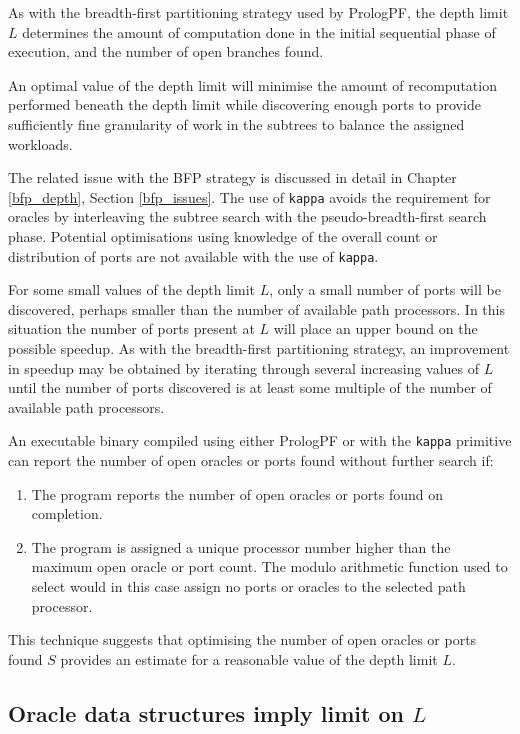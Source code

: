 As with the breadth-first partitioning strategy used by PrologPF, the depth
limit $L$ determines the amount of computation done in the initial sequential
phase of execution, and the number of open branches found.

An optimal value of the depth limit will minimise the amount of recomputation
performed beneath the depth limit while discovering enough ports to provide sufficiently
fine granularity of work in the subtrees to balance the assigned workloads.

The related issue with the BFP strategy is discussed in detail in Chapter \ref{bfp_depth},
Section \ref{bfp_issues}.  The use of \texttt{kappa} avoids the requirement for
oracles by interleaving the subtree search with the pseudo-breadth-first search phase.
Potential optimisations using knowledge of the overall count or distribution of ports
are not available with the use of \texttt{kappa}.

For some small values of the depth limit $L$,  only a small number of ports will
be discovered, perhaps smaller than the number of available path processors.  In
this situation the number of ports present at $L$ will place an upper bound on the
possible speedup.  As with the breadth-first partitioning strategy, an improvement
in speedup may be obtained by iterating through several increasing values of $L$
until the number of ports discovered is at least some multiple of the number of
available path processors.

An executable binary compiled using either PrologPF or with the \texttt{kappa}
primitive can report the number of open oracles or ports found without further
search if:\\
\begin{enumerate}
\item{The program reports the number of open oracles or ports found on completion.}
\item{The program is assigned a unique processor number higher than the maximum
  open oracle or port count.  The modulo arithmetic function used to select would
  in this case assign no ports or oracles to the selected path processor.}
\end{enumerate}
This technique suggests that optimising the number of open oracles or
ports found $S$ provides an estimate for a reasonable value of the depth
limit $L$.

\subsection{Oracle data structures imply limit on $L$}

